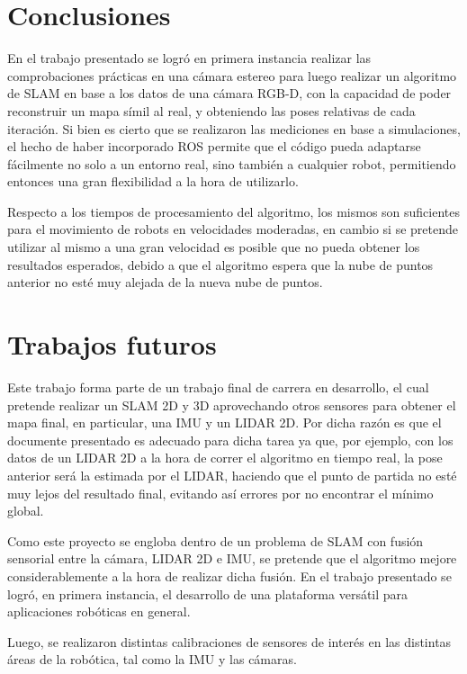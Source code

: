 \section{Conclusiones}
\label{sec:5_concl}
\ifimagenes
En el trabajo presentado se logró en primera instancia realizar las comprobaciones prácticas en una cámara estereo para luego realizar un algoritmo de SLAM en base a los datos de una cámara RGB-D, con la capacidad de poder reconstruir un mapa símil al real, y obteniendo las poses relativas de cada iteración. Si bien es cierto que se realizaron las mediciones en base a simulaciones, el hecho de haber incorporado ROS permite que el código pueda adaptarse fácilmente no solo a un entorno real, sino también a cualquier robot, permitiendo entonces una gran flexibilidad a la hora de utilizarlo. 

Respecto a los tiempos de procesamiento del algoritmo, los mismos son suficientes para el movimiento de robots en velocidades moderadas, en cambio si se pretende utilizar al mismo a una gran velocidad es posible que no pueda obtener los resultados esperados, debido a que el algoritmo espera que la nube de puntos anterior no esté muy alejada de la nueva nube de puntos. 

\section{Trabajos futuros}
Este trabajo forma parte de un trabajo final de carrera en desarrollo, el cual pretende realizar un SLAM 2D y 3D aprovechando otros sensores para obtener el mapa final, en particular, una IMU y un LIDAR 2D. Por dicha razón es que el documente presentado es adecuado para dicha tarea ya que, por ejemplo, con los datos de un LIDAR 2D a la hora de correr el algoritmo en tiempo real, la pose anterior será la estimada por el LIDAR, haciendo que el punto de partida no esté muy lejos del resultado final, evitando así errores por no encontrar el mínimo global.

Como este proyecto se engloba dentro de un problema de SLAM con fusión sensorial entre la cámara, LIDAR 2D e IMU, se pretende que el algoritmo mejore considerablemente a la hora de realizar dicha fusión.
\else
En el trabajo presentado se logró, en primera instancia, el desarrollo de una plataforma versátil para aplicaciones robóticas en general. 

Luego, se realizaron distintas calibraciones de sensores de interés en las distintas áreas de la robótica, tal como la IMU y las cámaras.

